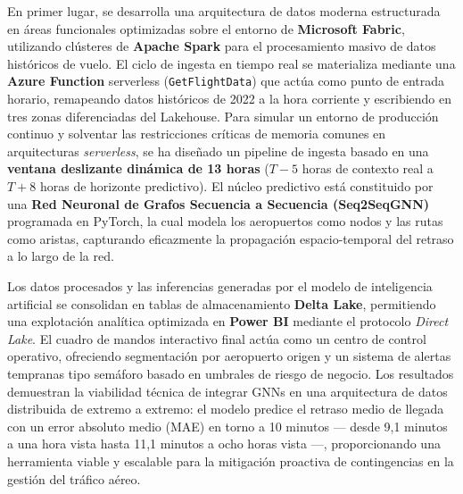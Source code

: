 \documentclass[12pt,oneside,a4paper]{report}
\renewcommand{\_}{\textunderscore\allowbreak}
\begin{document}
En primer lugar, se desarrolla una arquitectura de datos moderna estructurada en áreas funcionales optimizadas sobre el entorno de \textbf{Microsoft Fabric}, utilizando clústeres de \textbf{Apache Spark} para el procesamiento masivo de datos históricos de vuelo. El ciclo de ingesta en tiempo real se materializa mediante una \textbf{Azure Function} serverless (\texttt{GetFlightData}) que actúa como punto de entrada horario, remapeando datos históricos de 2022 a la hora corriente y escribiendo en tres zonas diferenciadas del Lakehouse. Para simular un entorno de producción continuo y solventar las restricciones críticas de memoria comunes en arquitecturas \textit{serverless}, se ha diseñado un pipeline de ingesta basado en una \textbf{ventana deslizante dinámica de 13 horas} ($T-5$ horas de contexto real a $T+8$ horas de horizonte predictivo). El núcleo predictivo está constituido por una \textbf{Red Neuronal de Grafos Secuencia a Secuencia (Seq2SeqGNN)} programada en PyTorch, la cual modela los aeropuertos como nodos y las rutas como aristas, capturando eficazmente la propagación espacio-temporal del retraso a lo largo de la red.

Los datos procesados y las inferencias generadas por el modelo de inteligencia artificial se consolidan en tablas de almacenamiento \textbf{Delta Lake}, permitiendo una explotación analítica optimizada en \textbf{Power BI} mediante el protocolo \textit{Direct Lake}. El cuadro de mandos interactivo final actúa como un centro de control operativo, ofreciendo segmentación por aeropuerto origen y un sistema de alertas tempranas tipo semáforo basado en umbrales de riesgo de negocio. Los resultados demuestran la viabilidad técnica de integrar GNNs en una arquitectura de datos distribuida de extremo a extremo: el modelo predice el retraso medio de llegada con un error absoluto medio (MAE) en torno a 10 minutos --- desde 9,1 minutos a una hora vista hasta 11,1 minutos a ocho horas vista ---, proporcionando una herramienta viable y escalable para la mitigación proactiva de contingencias en la gestión del tráfico aéreo.

\vspace{0.8cm}

\setcounter{page}{3}

\tableofcontents
\newpage

\cleardoublepage
\listoffigures
\newpage
\end{document}
